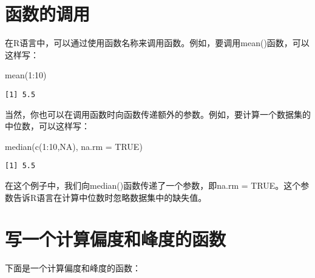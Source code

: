 \documentclass[
  letterpaper,
  DIV=11,
  numbers=noendperiod]{scrreprt}
\newenvironment{Shaded}{\begin{snugshade}}{\end{snugshade}}
\newcommand{\AttributeTok}[1]{\textcolor[rgb]{0.40,0.45,0.13}{#1}}
\newcommand{\ConstantTok}[1]{\textcolor[rgb]{0.56,0.35,0.01}{#1}}
\newcommand{\DecValTok}[1]{\textcolor[rgb]{0.68,0.00,0.00}{#1}}
\newcommand{\FunctionTok}[1]{\textcolor[rgb]{0.28,0.35,0.67}{#1}}
\newcommand{\NormalTok}[1]{\textcolor[rgb]{0.00,0.23,0.31}{#1}}
\newcommand{\SpecialCharTok}[1]{\textcolor[rgb]{0.37,0.37,0.37}{#1}}
\begin{document}
\section{函数的调用}\label{ux51fdux6570ux7684ux8c03ux7528}

在R语言中，可以通过使用函数名称来调用函数。例如，要调用mean()函数，可以这样写：

\begin{Shaded}
\begin{Highlighting}[]
\FunctionTok{mean}\NormalTok{(}\DecValTok{1}\SpecialCharTok{:}\DecValTok{10}\NormalTok{)}
\end{Highlighting}
\end{Shaded}

\begin{verbatim}
[1] 5.5
\end{verbatim}

当然，你也可以在调用函数时向函数传递额外的参数。例如，要计算一个数据集的中位数，可以这样写：

\begin{Shaded}
\begin{Highlighting}[]
\FunctionTok{median}\NormalTok{(}\FunctionTok{c}\NormalTok{(}\DecValTok{1}\SpecialCharTok{:}\DecValTok{10}\NormalTok{,}\ConstantTok{NA}\NormalTok{), }\AttributeTok{na.rm =} \ConstantTok{TRUE}\NormalTok{)}
\end{Highlighting}
\end{Shaded}

\begin{verbatim}
[1] 5.5
\end{verbatim}

在这个例子中，我们向median()函数传递了一个参数，即na.rm =
TRUE。这个参数告诉R语言在计算中位数时忽略数据集中的缺失值。

\section{写一个计算偏度和峰度的函数}\label{ux5199ux4e00ux4e2aux8ba1ux7b97ux504fux5ea6ux548cux5cf0ux5ea6ux7684ux51fdux6570}

下面是一个计算偏度和峰度的函数：
\end{document}
